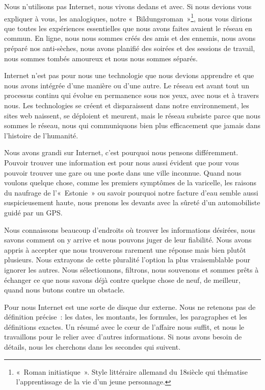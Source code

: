 Nous n’utilisons pas Internet, nous vivons dedans et avec. Si nous devions vous expliquer à vous, les analogiques, notre «~Bildungsroman~»\footnote{«~Roman initiatique~». Style littéraire allemand du
18\ieme siècle qui thématise l'apprentissage de la vie d'un jeune personnage.}, nous vous dirions que toutes les
expériences essentielles que nous avons faites avaient le réseau en commun. En ligne, nous nous sommes créés des amis et des ennemis, nous avons préparé nos anti-sèches, nous avons planifié des
soirées et des sessions de travail, nous sommes tombés amoureux et nous nous sommes séparés.

Internet n’est pas pour nous une technologie que nous devions apprendre et que nous avons intégrée d’une manière ou d’une autre. Le réseau est avant tout un processus continu qui évolue en permanence
sous nos yeux, avec nous et à travers nous. Les technologies se créent et disparaissent dans notre environnement, les sites web naissent, se déploient et meurent, mais le réseau subsiste parce que
nous
sommes le réseau, nous qui communiquons bien plus efficacement que jamais dans l’histoire de l’humanité.

Nous avons grandi sur Internet, c’est pourquoi nous pensons différemment. Pouvoir trouver une information est pour nous aussi évident que pour vous pouvoir trouver une gare ou une poste dans une ville
inconnue. Quand nous voulons quelque chose, comme les premiers symptômes de la varicelle, les raisons du naufrage de l’«~Estonie~» ou savoir pourquoi notre facture d’eau semble aussi suspicieusement
haute, nous prenons les devants avec la sûreté d’un automobiliste guidé par un GPS.

Nous connaissons beaucoup d’endroits où trouver les informations désirées, nous savons comment on y arrive et nous pouvons juger de leur fiabilité. Nous avons appris à accepter que nous trouverons
rarement une réponse mais bien plutôt plusieurs. Nous extrayons de cette pluralité l’option la plus vraisemblable pour ignorer les autres. Nous sélectionnons, filtrons, nous souvenons et sommes
prêts à échanger ce que nous savons déjà contre quelque chose de neuf, de meilleur, quand nous butons contre un obstacle.

Pour nous Internet est une sorte de disque dur externe. Nous ne retenons pas de définition précise~: les dates, les montants, les formules, les paragraphes et les définitions exactes. Un résumé avec
le cœur de l’affaire nous suffit, et nous le travaillons pour le relier avec d’autres informations. Si nous avons besoin de détails, nous les cherchons dans les secondes qui suivent.

